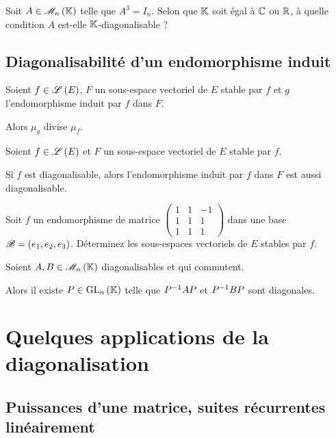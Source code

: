 \begin{exo}
Soit \(A\in\M{n}\) telle que \(A^3=I_n\). Selon que \(\mathbb{K}\) soit égal à \(\mathbb{C}\) ou \(\mathbb{R}\), à quelle condition \(A\) est-elle \(\mathbb{K}\)-diagonalisable ?
\end{exo}

\subsection{Diagonalisabilité d'un endomorphisme induit}

\begin{prop}
Soient \(f\in\mathscr{L}\left(E\right)\), \(F\) un sous-espace vectoriel de \(E\) stable par \(f\) et \(g\) l'endomorphisme induit par \(f\) dans \(F\).

Alors \(\mu_g\) divise \(\mu_f\).
\end{prop}

\begin{cor}
Soient \(f\in\mathscr{L}\left(E\right)\) et \(F\) un sous-espace vectoriel de \(E\) stable par \(f\).

Si \(f\) est diagonalisable, alors l'endomorphisme induit par \(f\) dans \(F\) est aussi diagonalisable.
\end{cor}

\begin{exo}
Soit \(f\) un endomorphisme de matrice \(\begin{pmatrix}
1 & 1 & -1 \\
1 & 1 & 1 \\
1 & 1 & 1
\end{pmatrix}\) dans une base \(\mathscr{B}=\left(e_1,e_2,e_3\right)\). Déterminez les sous-espaces vectoriels de \(E\) stables par \(f\).
\end{exo}

\begin{exo}

Soient \(A,B\in\M{n}\) diagonalisables et qui commutent.

Alors il existe \(P\in\GL{n}\) telle que \(P^{-1} AP\) et \(P^{-1} BP\) sont diagonales.
\end{exo}

\section{Quelques applications de la diagonalisation}

\subsection{Puissances d'une matrice, suites récurrentes linéairement}

